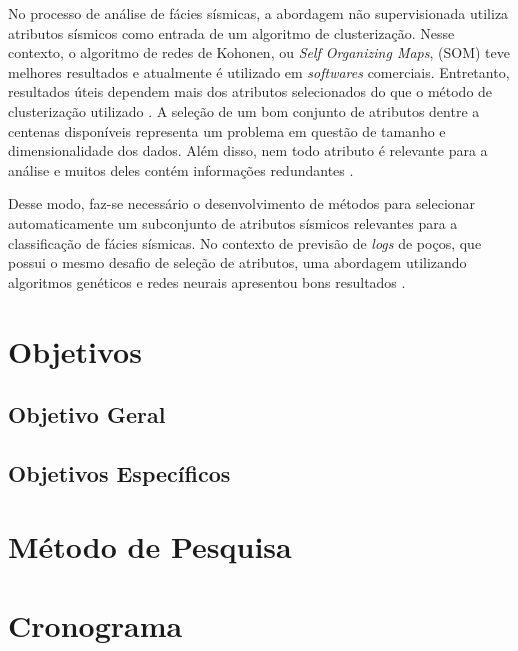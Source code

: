 \documentclass{ufsc-thesis}
\begin{document}
No processo de análise de fácies sísmicas, a abordagem não supervisionada utiliza atributos sísmicos como entrada de um algoritmo de clusterização. Nesse contexto, o algoritmo de redes de Kohonen, ou \textit{Self Organizing Maps}, (SOM) teve melhores resultados \cite{Coleou:2003} e atualmente é utilizado em \textit{softwares} comerciais. Entretanto, resultados úteis dependem mais dos atributos selecionados do que o método de clusterização utilizado \cite{Barnes:2002}. A seleção de um bom conjunto de atributos dentre a centenas disponíveis representa um problema em questão de tamanho e dimensionalidade dos dados. Além disso, nem todo atributo é relevante para a análise e muitos deles contém informações redundantes \cite{Barnes:2007}.

Desse modo, faz-se necessário o desenvolvimento de métodos para selecionar automaticamente um subconjunto de atributos sísmicos relevantes para a classificação de fácies sísmicas. No contexto de previsão de \textit{logs} de poços, que possui o mesmo desafio de seleção de atributos, uma abordagem utilizando algoritmos genéticos e redes neurais apresentou bons resultados \cite{Dorrington:2004}. 

\chapter{Objetivos}

\section{Objetivo Geral}

\section{Objetivos Específicos}


\chapter{Método de Pesquisa}

\chapter{Cronograma}
\end{document}
